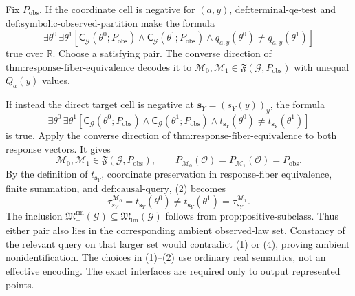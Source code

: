 Fix \(P_{\mathrm{obs}}\). If the coordinate cell is negative for \((a,y)\), \(\text{def:terminal-qe-test}\) and \(\text{def:symbolic-observed-partition}\) make the formula
\[
\exists\theta^0\,\exists\theta^1
\left[
\mathsf C_{\mathcal G}(\theta^0;P_{\mathrm{obs}})
\wedge\mathsf C_{\mathcal G}(\theta^1;P_{\mathrm{obs}})
\wedge q_{a,y}(\theta^0)\neq q_{a,y}(\theta^1)
\right]
\tag{1}
\]
true over \(\mathbb R\). Choose a satisfying pair. The converse direction of \(\text{thm:response-fiber-equivalence}\) decodes it to \(\mathcal M_0,\mathcal M_1\in\mathfrak F(\mathcal G,P_{\mathrm{obs}})\) with unequal \(Q_a(y)\) values.

If instead the direct target cell is negative at \(\mathbf s_Y=(s_Y(y))_y\), the formula
\[
\exists\theta^0\,\exists\theta^1
\left[
\mathsf C_{\mathcal G}(\theta^0;P_{\mathrm{obs}})
\wedge\mathsf C_{\mathcal G}(\theta^1;P_{\mathrm{obs}})
\wedge t_{\mathbf s_Y}(\theta^0)\neq t_{\mathbf s_Y}(\theta^1)
\right]
\tag{2}
\]
is true. Apply the converse direction of \(\text{thm:response-fiber-equivalence}\) to both response vectors. It gives
\[
\mathcal M_0,\mathcal M_1\in\mathfrak F(\mathcal G,P_{\mathrm{obs}}),
\qquad
P_{\mathcal M_0}(\mathcal O)=P_{\mathcal M_1}(\mathcal O)=P_{\mathrm{obs}}.
\tag{3}
\]
By the definition of \(t_{\mathbf s_Y}\), coordinate preservation in response-fiber equivalence, finite summation, and \(\text{def:causal-query}\), (2) becomes
\[
\tau_{s_Y}^{\mathcal M_0}=t_{\mathbf s_Y}(\theta^0)
\neq t_{\mathbf s_Y}(\theta^1)=\tau_{s_Y}^{\mathcal M_1}.
\tag{4}
\]
The inclusion \(\mathfrak M_{+}^{\mathrm{rm}}(\mathcal G)\subseteq\mathfrak M_{\mathrm{lm}}(\mathcal G)\) follows from \(\text{prop:positive-subclass}\). Thus either pair also lies in the corresponding ambient observed-law set. Constancy of the relevant query on that larger set would contradict (1) or (4), proving ambient nonidentification. The choices in (1)--(2) use ordinary real semantics, not an effective encoding. The exact interfaces are required only to output represented points.